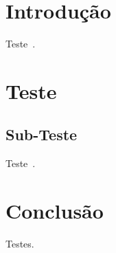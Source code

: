 \section{Introdução}

    Teste~\cite{ARA, ARC, A21, PESH}.



\section{Teste}

    \subsection{Sub-Teste}

    Teste~\cite{ARA}.



\section{Conclusão}

    Testes.

